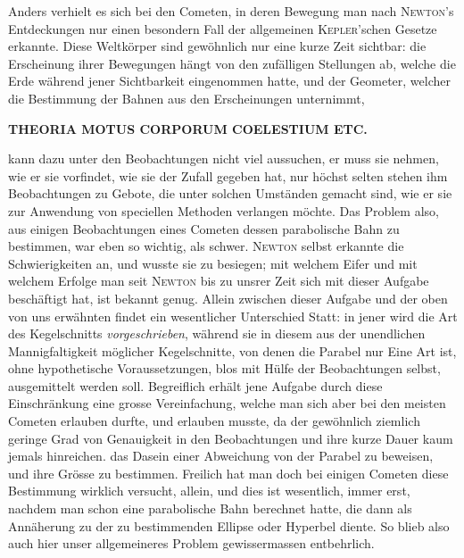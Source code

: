 Anders verhielt es sich bei den Cometen, in deren Bewegung man nach \textsc{Newton}'s Entdeckungen nur einen besondern Fall der allgemeinen \textsc{Kepler}'schen Gesetze erkannte. Diese Weltkörper sind gewöhnlich nur eine kurze Zeit sichtbar: die Erscheinung ihrer Bewegungen hängt von den zufälligen Stellungen ab, welche die Erde während jener Sichtbarkeit eingenommen hatte, und der Geometer, welcher die Bestimmung der Bahnen aus den Erscheinungen unternimmt,
\par
\clearpage
\thispagestyle{empty}
\noindent{}%
\makebox[12mm][l]{}%
\parbox[t]{\dimexpr\linewidth-24mm\relax}{\centering\footnotesize\bfseries THEORIA MOTUS CORPORUM COELESTIUM ETC.\par}%
\par\nobreak\medskip
\noindent kann dazu unter den Beobachtungen nicht viel aussuchen, er muss sie nehmen, wie er sie vorfindet, wie sie der Zufall gegeben hat, nur höchst selten stehen ihm Beobachtungen zu Gebote, die unter solchen Umständen gemacht sind, wie er sie zur Anwendung von speciellen Methoden verlangen möchte. Das Problem also, aus einigen Beobachtungen eines Cometen dessen parabolische Bahn zu bestimmen, war eben so wichtig, als schwer. \textsc{Newton} selbst erkannte die Schwierigkeiten an, und wusste sie zu besiegen; mit welchem Eifer und mit welchem Erfolge man seit \textsc{Newton} bis zu unsrer Zeit sich mit dieser Aufgabe beschäftigt hat, ist bekannt genug. Allein zwischen dieser Aufgabe und der oben von uns erwähnten findet ein wesentlicher Unterschied Statt: in jener wird die Art des Kegelschnitts \textit{vorgeschrieben}, während sie in diesem aus der unendlichen Mannigfaltigkeit möglicher Kegelschnitte, von denen die Parabel nur Eine Art ist, ohne hypothetische Voraussetzungen, blos mit Hülfe der Beobachtungen selbst, ausgemittelt werden soll. Begreiflich erhält jene Aufgabe durch diese Einschränkung eine grosse Vereinfachung, welche man sich aber bei den meisten Cometen erlauben durfte, und erlauben musste, da der gewöhnlich ziemlich geringe Grad von Genauigkeit in den Beobachtungen und ihre kurze Dauer kaum jemals hinreichen. das Dasein einer Abweichung von der Parabel zu beweisen, und ihre Grösse zu bestimmen. Freilich hat man doch bei einigen Cometen diese Bestimmung wirklich versucht, allein, und dies ist wesentlich, immer erst, nachdem man schon eine parabolische Bahn berechnet hatte, die dann als Annäherung zu der zu bestimmenden Ellipse oder Hyperbel diente. So blieb also auch hier unser allgemeineres Problem gewissermassen entbehrlich.

